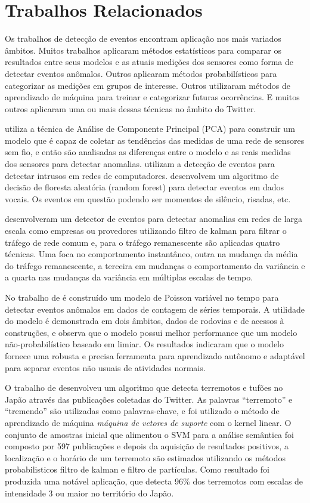 \section{Trabalhos Relacionados}

Os trabalhos de detecção de eventos encontram aplicação nos mais variados âmbitos. Muitos trabalhos aplicaram métodos estatísticos para comparar os resultados entre seus modelos e as atuais medições dos sensores como forma de detectar eventos anômalos. Outros aplicaram métodos probabilísticos para categorizar as medições em grupos de interesse. Outros utilizaram métodos de aprendizado de máquina para treinar e categorizar futuras ocorrências. E muitos outros aplicaram uma ou mais dessas técnicas no âmbito do Twitter.

 utiliza a técnica de Análise de Componente Principal (PCA) para construir um modelo que é capaz de coletar as tendências das medidas de uma rede de sensores sem fio, e então são analisadas as diferenças entre o modelo e as reais medidas dos sensores para detectar anomalias.  utilizam a detecção de eventos para detectar intrusos em redes de computadores.  desenvolvem um algoritmo de decisão de floresta aleatória (random forest) para detectar eventos em dados vocais. Os eventos em questão podendo ser momentos de silêncio, risadas, etc.

 desenvolveram um detector de eventos para detectar anomalias em redes de larga escala como empresas ou provedores utilizando filtro de kalman para filtrar o tráfego de rede comum e, para o tráfego remanescente são aplicadas quatro técnicas. Uma foca no comportamento instantâneo, outra na mudança da média do tráfego remanescente, a terceira em mudanças o comportamento da variância e a quarta nas mudanças da variância em múltiplas escalas de tempo.

No trabalho de  é construído um modelo de Poisson variável no tempo para detectar eventos anômalos em dados de contagem de séries temporais. A utilidade do modelo é demonstrada em dois âmbitos, dados de rodovias e de acessos à construções, e observa que o modelo possui melhor performance que um modelo não-probabilístico baseado em limiar. Os resultados indicaram que o modelo fornece uma robusta e precisa ferramenta para aprendizado autônomo e adaptável para separar eventos não usuais de atividades normais.

O trabalho de  desenvolveu um algoritmo que detecta terremotos e tufões no Japão através das publicações coletadas do Twitter. As palavras ``terremoto'' e ``tremendo'' são utilizadas como palavras-chave, e foi utilizado o método de aprendizado de máquina \textit{máquina de vetores de suporte} com o kernel linear. O conjunto de amostras inicial que alimentou o SVM para a análise semântica foi composto por 597 publicações e depois da aquisição de resultados positivos, a localização e o horário de um terremoto são estimados utilizando os métodos probabilisticos filtro de kalman e filtro de partículas. Como resultado foi produzida uma notável aplicação, que detecta 96\% dos terremotos com escalas de intensidade 3 ou maior no território do Japão.

